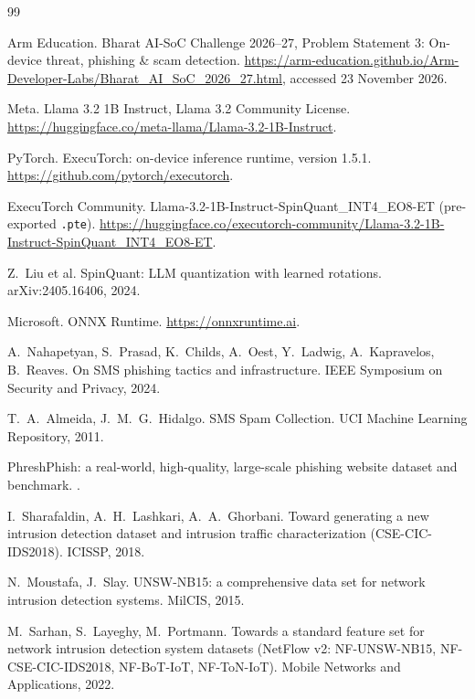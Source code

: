 \begin{thebibliography}{99}
\small

Arm Education.
\newblock Bharat AI-SoC Challenge 2026--27, Problem Statement 3: On-device threat, phishing \& scam detection.
\newblock \url{https://arm-education.github.io/Arm-Developer-Labs/Bharat_AI_SoC_2026_27.html}, accessed 23 November 2026.

Meta.
\newblock Llama 3.2 1B Instruct, Llama 3.2 Community License.
\newblock \url{https://huggingface.co/meta-llama/Llama-3.2-1B-Instruct}.

PyTorch.
\newblock ExecuTorch: on-device inference runtime, version 1.5.1.
\newblock \url{https://github.com/pytorch/executorch}.

ExecuTorch Community.
\newblock Llama-3.2-1B-Instruct-SpinQuant\_INT4\_EO8-ET (pre-exported \texttt{.pte}).
\newblock \url{https://huggingface.co/executorch-community/Llama-3.2-1B-Instruct-SpinQuant_INT4_EO8-ET}.

Z.~Liu et al.
\newblock SpinQuant: LLM quantization with learned rotations.
\newblock arXiv:2405.16406, 2024.

Microsoft.
\newblock ONNX Runtime.
\newblock \url{https://onnxruntime.ai}.

A.~Nahapetyan, S.~Prasad, K.~Childs, A.~Oest, Y.~Ladwig, A.~Kapravelos, B.~Reaves.
\newblock On SMS phishing tactics and infrastructure.
\newblock IEEE Symposium on Security and Privacy, 2024.

T.~A.~Almeida, J.~M.~G.~Hidalgo.
\newblock SMS Spam Collection.
\newblock UCI Machine Learning Repository, 2011.

PhreshPhish: a real-world, high-quality, large-scale phishing website dataset and benchmark.
.

I.~Sharafaldin, A.~H.~Lashkari, A.~A.~Ghorbani.
\newblock Toward generating a new intrusion detection dataset and intrusion traffic characterization (CSE-CIC-IDS2018).
\newblock ICISSP, 2018.

N.~Moustafa, J.~Slay.
\newblock UNSW-NB15: a comprehensive data set for network intrusion detection systems.
\newblock MilCIS, 2015.

M.~Sarhan, S.~Layeghy, M.~Portmann.
\newblock Towards a standard feature set for network intrusion detection system datasets (NetFlow v2: NF-UNSW-NB15, NF-CSE-CIC-IDS2018, NF-BoT-IoT, NF-ToN-IoT).
\newblock Mobile Networks and Applications, 2022.

\end{thebibliography}
